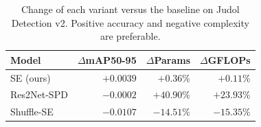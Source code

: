 \begin{table}[t]
\caption{Change of each variant versus the baseline on Judol Detection v2. Positive accuracy and negative complexity are preferable.}
\label{tab:relative}
\centering
\footnotesize
\renewcommand{\arraystretch}{1.3}
\setlength{\tabcolsep}{6pt}
\begin{tabular}{@{}lrrr@{}}
\toprule
\textbf{Model} & \textbf{$\Delta$mAP50-95} & \textbf{$\Delta$Params} & \textbf{$\Delta$GFLOPs} \\
\midrule
SE (ours)     & $+0.0039$ & $+0.36\%$  & $+0.11\%$  \\
Res2Net-SPD   & $-0.0002$ & $+40.90\%$ & $+23.93\%$ \\
Shuffle-SE    & $-0.0107$ & $-14.51\%$ & $-15.35\%$ \\
\bottomrule
\end{tabular}
\end{table}
